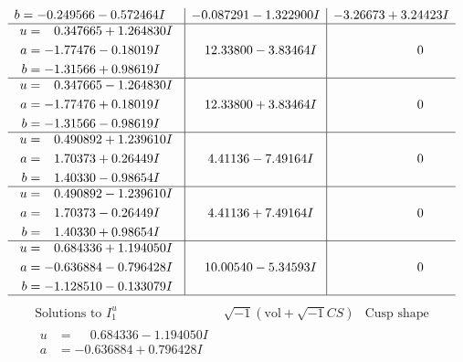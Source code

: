 \documentclass[1p]{elsarticle_modified}
\theoremstyle{definition}
\newcommand{\I}{\sqrt{-1}}
\begin{document}
$$\begin{array}{c|c|c}
\begin{aligned}
b &= -0.249566 - 0.572464 I\end{aligned}
 & -0.087291 - 1.322900 I & -3.26673 + 3.24423 I \\ \hline\begin{aligned}
u &= \phantom{-}0.347665 + 1.264830 I \\
a &= -1.77476 - 0.18019 I \\
b &= -1.31566 + 0.98619 I\end{aligned}
 & \phantom{-}12.33800 - 3.83464 I & \phantom{-0.000000 } 0 \\ \hline\begin{aligned}
u &= \phantom{-}0.347665 - 1.264830 I \\
a &= -1.77476 + 0.18019 I \\
b &= -1.31566 - 0.98619 I\end{aligned}
 & \phantom{-}12.33800 + 3.83464 I & \phantom{-0.000000 } 0 \\ \hline\begin{aligned}
u &= \phantom{-}0.490892 + 1.239610 I \\
a &= \phantom{-}1.70373 + 0.26449 I \\
b &= \phantom{-}1.40330 - 0.98654 I\end{aligned}
 & \phantom{-}4.41136 - 7.49164 I & \phantom{-0.000000 } 0 \\ \hline\begin{aligned}
u &= \phantom{-}0.490892 - 1.239610 I \\
a &= \phantom{-}1.70373 - 0.26449 I \\
b &= \phantom{-}1.40330 + 0.98654 I\end{aligned}
 & \phantom{-}4.41136 + 7.49164 I & \phantom{-0.000000 } 0 \\ \hline\begin{aligned}
u &= \phantom{-}0.684336 + 1.194050 I \\
a &= -0.636884 - 0.796428 I \\
b &= -1.128510 - 0.133079 I\end{aligned}
 & \phantom{-}10.00540 - 5.34593 I & \phantom{-0.000000 } 0\\
 \hline 
 \end{array}$$\newpage$$\begin{array}{c|c|c}  
\text{Solutions to }I^u_{1}& \I (\text{vol} + \sqrt{-1}CS) & \text{Cusp shape}\\
 \hline 
\begin{aligned}
u &= \phantom{-}0.684336 - 1.194050 I \\
a &= -0.636884 + 0.796428 I \\

\end{aligned}
\end{array}$$
\end{document}
